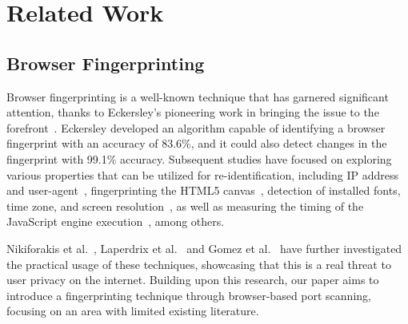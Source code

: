 \chapter{Related Work}





\section{Browser Fingerprinting}
\label{browser-fingerprinting}

Browser fingerprinting is a well-known technique that has garnered significant attention, thanks to Eckersley's pioneering work in bringing the issue to the forefront~. Eckersley developed an algorithm capable of identifying a browser fingerprint with an accuracy of 83.6\%, and it could also detect changes in the fingerprint with 99.1\% accuracy. Subsequent studies have focused on exploring various properties that can be utilized for re-identification, including IP address and user-agent~, fingerprinting the HTML5 canvas~, detection of installed fonts, time zone, and screen resolution~, as well as measuring the timing of the JavaScript engine execution~, among others.

Nikiforakis et al.~, Laperdrix et al.~ and Gomez et al.~ have further investigated the practical usage of these techniques, showcasing that this is a real threat to user privacy on the internet. Building upon this research, our paper aims to introduce a fingerprinting technique through browser-based port scanning, focusing on an area with limited existing literature.

